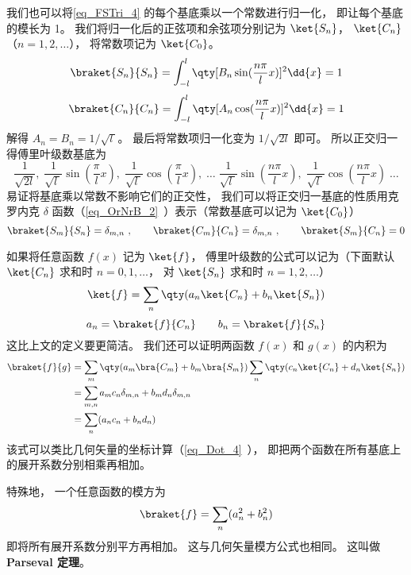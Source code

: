 我们也可以将\autoref{eq_FSTri_4} 的每个基底乘以一个常数进行归一化， 即让每个基底的模长为 1。 我们将归一化后的正弦项和余弦项分别记为 $\ket{S_n}$， $\ket{C_n}$ （$n = 1, 2,\dots$）， 将常数项记为 $\ket{C_0}$。
\begin{equation}
\braket{S_n}{S_n} = \int_{-l}^l \qty[B_n \sin(\frac{n\pi}{l}x)]^2 \dd{x} = 1
\end{equation}
\begin{equation}
\braket{C_n}{C_n} = \int_{-l}^l \qty[A_n \cos(\frac{n\pi}{l}x)]^2 \dd{x} = 1
\end{equation}
解得 $A_n = B_n = 1/\sqrt{l\ }$。 最后将常数项归一化变为 $1/\sqrt{2l}$ 即可。 所以正交归一得傅里叶级数基底为
\begin{equation}
\frac{1}{\sqrt{2l}},\;   \frac{1}{\sqrt{l\ }}\sin(\frac{\pi}{l} x),\;   \frac{1}{\sqrt{l\ }}\cos(\frac{\pi}{l} x),\;   \dots\;  \frac{1}{\sqrt{l\ }}\sin(\frac{n\pi}{l} x),\;   \frac{1}{\sqrt{l\ }}\cos(\frac{n\pi}{l} x)\;   \dots
\end{equation}
易证将基底乘以常数不影响它们的正交性， 我们可以将正交归一基底的性质用克罗内克 $\delta$ 函数（\autoref{eq_OrNrB_2}~）表示（常数基底可以记为 $\ket{C_0}$）
\begin{equation}
\braket{S_m}{S_n} = \delta_{m,n}~,
\qquad
\braket{C_m}{C_n} = \delta_{m, n}~,
\qquad
\braket{S_m}{C_n} = 0
\end{equation}

如果将任意函数 $f(x)$ 记为 $\ket{f}$， 傅里叶级数的公式可以记为（下面默认 $\ket{C_n}$ 求和时 $n = 0, 1, \dots$， 对 $\ket{S_n}$ 求和时 $n = 1, 2, \dots$）
\begin{equation}
\ket{f} = \sum_n \qty(a_n \ket{C_n} + b_n \ket{S_n})
\end{equation}
\begin{equation}
a_n = \braket{f}{C_n}
\qquad
b_n = \braket{f}{S_n}
\end{equation}
这比上文的定义要更简洁。 我们还可以证明两函数 $f(x)$ 和 $g(x)$ 的内积为
\begin{equation}
\begin{aligned}
\braket{f}{g} &= \sum_m \qty(a_m \bra{C_m} + b_m \bra{S_m}) \sum_n \qty(c_n \ket{C_n} + d_n \ket{S_n})\\
&= \sum_{m, n} a_m c_n \delta_{m, n} + b_m d_n \delta_{m, n}\\
&= \sum_n (a_n c_n + b_n d_n)
\end{aligned}
\end{equation}
该式可以类比几何矢量的坐标计算（\autoref{eq_Dot_4}~）， 即把两个函数在所有基底上的展开系数分别相乘再相加。

特殊地， 一个任意函数的模方为
\begin{equation}
\braket{f} = \sum_n (a_n^2 + b_n^2)
\end{equation}
即将所有展开系数分别平方再相加。 这与几何矢量模方公式也相同。 这叫做 \textbf{Parseval 定理}。
